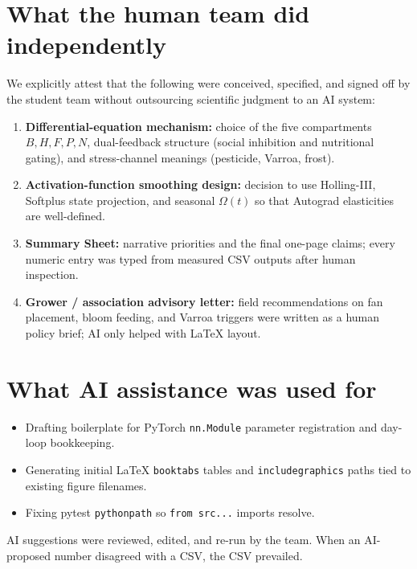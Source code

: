 \documentclass[11pt]{article}
\begin{document}
\section{What the human team did independently}
We explicitly attest that the following were conceived, specified, and
signed off by the student team without outsourcing scientific judgment
to an AI system:
\begin{enumerate}[leftmargin=1.4em]
  \item \textbf{Differential-equation mechanism:} choice of the five
        compartments \(B,H,F,P,N\), dual-feedback structure (social
        inhibition and nutritional gating), and stress-channel meanings
        (pesticide, Varroa, frost).
  \item \textbf{Activation-function smoothing design:} decision to use
        Holling-III, Softplus state projection, and seasonal
        \(\Omega(t)\) so that Autograd elasticities are well-defined.
  \item \textbf{Summary Sheet:} narrative priorities and the final
        one-page claims; every numeric entry was typed from measured CSV
        outputs after human inspection.
  \item \textbf{Grower / association advisory letter:} field
        recommendations on fan placement, bloom feeding, and Varroa
        triggers were written as a human policy brief; AI only helped
        with LaTeX layout.
\end{enumerate}

\section{What AI assistance was used for}
\begin{itemize}[leftmargin=1.4em]
  \item Drafting boilerplate for PyTorch \texttt{nn.Module} parameter
        registration and day-loop bookkeeping.
  \item Generating initial LaTeX \texttt{booktabs} tables and
        \texttt{includegraphics} paths tied to existing figure filenames.
  \item Fixing pytest \texttt{pythonpath} so \texttt{from src...}
        imports resolve.
\end{itemize}
AI suggestions were reviewed, edited, and re-run by the team. When an
AI-proposed number disagreed with a CSV, the CSV prevailed.
\end{document}
